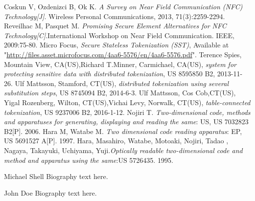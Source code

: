 \documentclass[journal]{IEEEtran}
\begin{document}
\begin{thebibliography}{1}
Coskun V, Ozdenizci B, Ok K. \emph{A Survey on Near Field Communication (NFC) Technology[J]}. Wireless Personal Communications, 2013, 71(3):2259-2294.
Reveilhac M, Pasquet M. \emph{Promising Secure Element Alternatives for NFC Technology[C]}.International Workshop on Near Field Communication. IEEE, 2009:75-80.
Micro Focus, \emph{Secure Stateless Tokenization (SST)}, Available at "\url{http://files.asset.microfocus.com/4aa6-5576/en/4aa6-5576.pdf}".
Terence Spies, Mountain View, CA(US),Richard T.Minner, Carmichael, CA(US), \emph{system for protecting sensitive data with distributed tokenization}, US 8595850 B2, 2013-11-26.
Ulf Mattsson, Stamford, CT(US), \emph{distributed tokenization using several substitution steps}, US 8745094 B2, 2014-6-3.
Ulf Mattsson, Cos Cob,CT(US), Yigal Rozenberg, Wilton, CT(US),Vichai Levy, Norwalk, CT(US), \emph{table-connected tokenization}, US 9237006 B2, 2016-1-12. 
Nojiri T. \emph{Two-dimensional code, methods and apparatuses for generating, displaying and reading the same}: US, US 7032823 B2[P]. 2006.
Hara M, Watabe M. \emph{Two dimensional code reading apparatus}: EP, US 5691527 A[P]. 1997.
Hara, Masahiro, Watabe, Motoaki, Nojiri, Tadao , Nagaya, Takayuki, Uchiyama, Yuji.\emph{Optically readable two-dimensional code and method and apparatus using the same}:US 5726435. 1995.

\end{thebibliography}


% 

\begin{IEEEbiography}{Michael Shell}
Biography text here.
\end{IEEEbiography}

\begin{IEEEbiographynophoto}{John Doe}
Biography text here.
\end{IEEEbiographynophoto}
\end{document}
